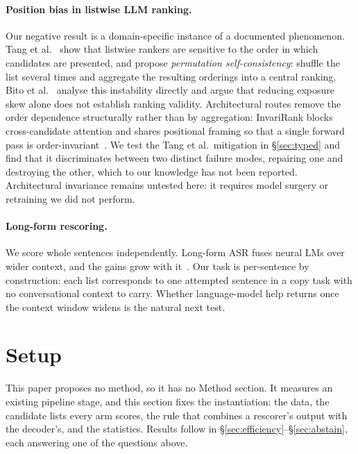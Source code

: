 \documentclass[11pt]{article}
\begin{document}
\paragraph{Position bias in listwise LLM ranking.} Our negative result is a
domain-specific instance of a documented phenomenon. Tang et al.~\cite{tang2023psc} show
that listwise rankers are sensitive to the order in which candidates are presented, and
propose \emph{permutation self-consistency}: shuffle the list several times and aggregate
the resulting orderings into a central ranking. Bito et al.~\cite{bito2026position} analyse
this instability directly and argue that reducing exposure skew alone does not establish
ranking validity. Architectural routes remove the order dependence structurally rather than
by aggregation: InvariRank blocks cross-candidate attention and shares positional framing so
that a single forward pass is order-invariant~\cite{bito2026invarirank}. We test the Tang
et al.\ mitigation in \S\ref{sec:typed} and find that it discriminates between two distinct
failure modes, repairing one and destroying the other, which to our knowledge has not
been reported. Architectural invariance remains untested here: it requires model surgery or
retraining we did not perform.

\paragraph{Long-form rescoring.} We score whole sentences independently. Long-form ASR
fuses neural LMs over wider context, and the gains grow with it~\cite{chen2023longform}.
Our task is per-sentence by construction: each list corresponds to one attempted sentence
in a copy task with no conversational context to carry. Whether language-model help
returns once the context window widens is the natural next test.

\section{Setup}
\label{sec:setup}

This paper proposes no method, so it has no Method section. It measures an existing
pipeline stage, and this section fixes the instantiation: the data, the candidate lists
every arm scores, the rule that combines a rescorer's output with the decoder's, and the
statistics. Results follow in \S\ref{sec:efficiency}--\S\ref{sec:abstain}, each
answering one of the questions above.
\end{document}
